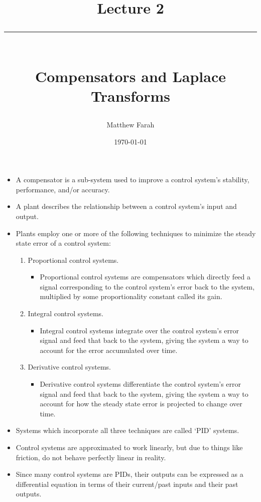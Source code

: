\documentclass{article}
\date{
	\vspace{-.75em}
	{\large \today}
}
\title{
	\vspace*{-1.5em}
	{\Huge Lecture 2} \\
	\vspace{-1em}
	\rule{\textwidth/4}{.01em} \\
	\vspace{-.25em}
	{\Large Compensators and Laplace Transforms}
	\vspace{-.75em}
}
\author{
	{\large Matthew Farah}
}
\begin{document}
\maketitle
\pagestyle{fancy}

\fi

\begin{itemize}
	\item A compensator is a sub-system used to improve a control system's stability, performance, and/or accuracy.
	\item A plant describes the relationship between a control system's input and output.
	\item Plants employ one or more of the following techniques to minimize the steady state error of a control system:
	\begin{enumerate}
		\item Proportional control systems.
		\begin{itemize}
			\item Proportional control systems are compensators which directly feed a signal corresponding to the control system's error back to the system, multiplied by some proportionality constant called its gain.
		\end{itemize}
		\item Integral control systems.
		\begin{itemize}
			\item Integral control systems integrate over the control system's error signal and feed that back to the system, giving the system a way to account for the error accumulated over time.
		\end{itemize}
		\item Derivative control systems.
		\begin{itemize}
			\item Derivative control systems differentiate the control system's error signal and feed that back to the system, giving the system a way to account for how the steady state error is projected to change over time.
		\end{itemize}
	\end{enumerate}
	\item Systems which incorporate all three techniques are called `PID' systems.
	\item Control systems are approximated to work linearly, but due to things like friction, do not behave perfectly linear in reality.
	\item Since many control systems are PIDs, their outputs can be expressed as a differential equation in terms of their current/past inputs and their past outputs.

\end{itemize}
\end{document}
